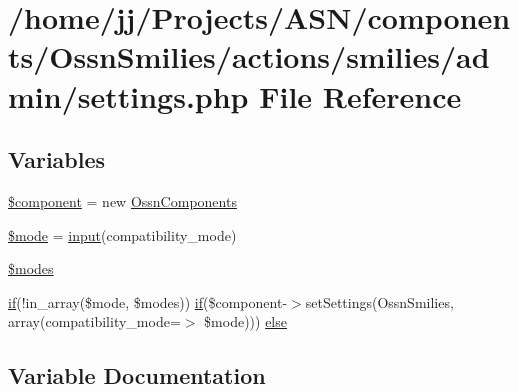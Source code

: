\hypertarget{components_2_ossn_smilies_2actions_2smilies_2admin_2settings_8php}{}\section{/home/jj/\+Projects/\+A\+S\+N/components/\+Ossn\+Smilies/actions/smilies/admin/settings.php File Reference}
\label{components_2_ossn_smilies_2actions_2smilies_2admin_2settings_8php}
\subsection*{Variables}
\begin{DoxyCompactItemize}
\item 
\hyperlink{components_2_ossn_smilies_2actions_2smilies_2admin_2settings_8php_a211527c21ba56109545060b49b628e59}{\$component} = new \hyperlink{class_ossn_components}{Ossn\+Components}
\item 
\hyperlink{components_2_ossn_smilies_2actions_2smilies_2admin_2settings_8php_a3aaf40baac36e278c7d7c9139df1750c}{\$mode} = \hyperlink{ossn_8lib_8input_8php_a64ebee98b041c4f75f71ed3cd73cc8ed}{input}(\textquotesingle{}compatibility\+\_\+mode\textquotesingle{})
\item 
\hyperlink{components_2_ossn_smilies_2actions_2smilies_2admin_2settings_8php_ae8288b42b06e9f4783f1667d86e30bae}{\$modes}
\item 
\hyperlink{jquery_8tokeninput_8js_ad8dd46a3cbc004569e34401e9e71771a}{if}(!in\+\_\+array(\$mode, \$modes)) \hyperlink{jquery_8tokeninput_8js_ad8dd46a3cbc004569e34401e9e71771a}{if}(\$component-\/$>$set\+Settings(\textquotesingle{}Ossn\+Smilies\textquotesingle{}, array(\textquotesingle{}compatibility\+\_\+mode\textquotesingle{}=$>$ \$mode))) \hyperlink{components_2_ossn_smilies_2actions_2smilies_2admin_2settings_8php_a22fafe652c6ed1f2ecfc5a3e98feff4d}{else}
\end{DoxyCompactItemize}


\subsection{Variable Documentation}
